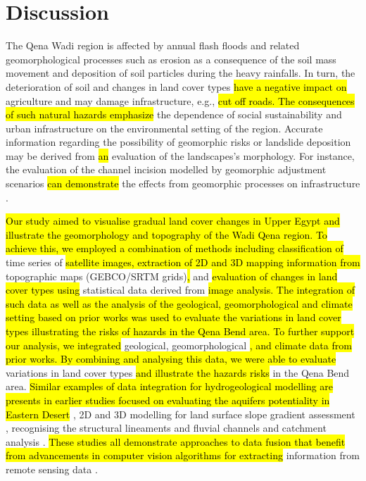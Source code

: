 \documentclass[information,article,submit,pdftex,moreauthors]{Definitions/mdpi}
\begin{document}
\section{Discussion}

The Qena Wadi region is affected by annual flash floods and related geomorphological processes such as erosion as a consequence of the soil mass movement and deposition of soil particles during the heavy rainfalls. In turn, the deterioration of soil and changes in land cover types \hl{have a negative impact on }agriculture and may damage infrastructure, e.g., \hl{cut off roads. The consequences of such natural hazards emphasize }the dependence of social sustainability and urban infrastructure on the environmental setting of the region. Accurate information regarding the possibility of geomorphic risks or landslide deposition may be derived from \hl{an }evaluation of the landscapes's morphology. For instance, the evaluation of the channel incision modelled by geomorphic adjustment scenarios \hl{can demonstrate } the effects from geomorphic processes on infrastructure \cite{Hermas}.

\hl{Our study aimed to visualise gradual land cover changes in Upper Egypt and illustrate the geomorphology and topography of the Wadi Qena region. To achieve this, we employed a combination of methods including classification of }time series of \hl{satellite images, extraction of 2D and 3D mapping information from } topographic maps (GEBCO/SRTM grids)\hl{, }and \hl{evaluation of changes in land cover types using }statistical data derived from \hl{image analysis. The integration of such data as well as the analysis of the geological, geomorphological and climate setting based on prior works was used to evaluate the variations in land cover types illustrating the risks of hazards in the Qena Bend area. To further support our analysis, we integrated } geological, geomorphological \hl{, and climate data from prior works. By combining and analysing this data, we were able to evaluate }variations in land cover types \hl{and illustrate the hazards risks }in the Qena Bend area. \hl{Similar examples of data integration for hydrogeological modelling are presents in earlier studies focused on evaluating the aquifers potentiality in Eastern Desert} \cite{Moneim,ELHAMEED2017218}, 2D and 3D modelling for land surface slope gradient assessment \cite{Othman}, recognising the structural lineaments and fluvial channels and catchment analysis \cite{rs12101559}. \hl{These studies all demonstrate approaches to data fusion that benefit from advancements in computer vision algorithms for extracting} information from remote sensing data \cite{AZZAZY2022104805}.
\end{document}
